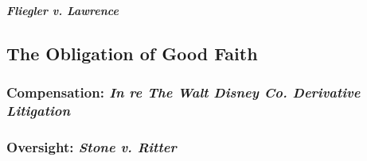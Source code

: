\paragraph{\emph{Fliegler v. Lawrence}}


\subsection{The Obligation of Good Faith}

\subsubsection{Compensation: \emph{In re The Walt Disney Co. Derivative Litigation}}


\subsubsection{Oversight: \emph{Stone v. Ritter}}

